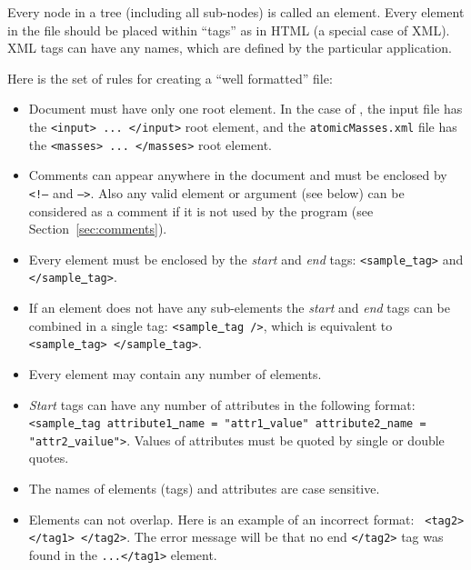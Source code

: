 \documentclass[11pt]{article}
\begin{document}
Every node in a tree (including all sub-nodes) is called an element. 
Every element in the \xml file should be placed within ``tags'' as in HTML (a special case of XML). 
XML tags can have any names, which are defined by the particular application.

Here is the set of rules for creating a ``well formatted'' \xml file:
\begin{itemize}

\item Document must have only one root element. 
In the case of \ezFCF, the input file has the {\tt <input> ... </input>} root element, 
and the {\tt atomicMasses.xml} file has the {\tt <masses> ... </masses>} root element.

\item Comments can appear anywhere in the document and must be enclosed by {\tt <!--} and {\tt -->}. 
Also any valid element or argument (see below) can be considered as a comment if it is not used by the program
(see Section~\ref{sec:comments}).

\item Every element must be enclosed by the {\em start} and {\em end} tags: 
{\tt <sample\underline{~}tag>} and {\tt </sample\underline{~}tag>}.

\item If an element does not have any sub-elements the {\em start} and {\em end} tags can be combined in a single tag: 
{\tt <sample\underline{~}tag />}, which is equivalent to {\tt <sample\underline{~}tag>  </sample\underline{~}tag>}.

\item Every element may contain any number of elements.

\item {\em Start} tags can have any number of attributes in the following format: 
{\tt <sample\underline{~}tag attribute1\underline{~}name = "attr1\underline{~}value" attribute2\underline{~}name = "attr2\underline{~}vailue">}. 
Values of attributes must be quoted by single or double quotes.

\item The names of elements (tags) and attributes are case sensitive.

\item Elements can not overlap. 
Here is an example of an incorrect format: {\tt <tag1> <tag2> </tag1> </tag2>}. 
The error message will be that no end {\tt </tag2>} tag was found in the {\tt <tag1>...</tag1>} element.

\end{itemize}
\end{document}
